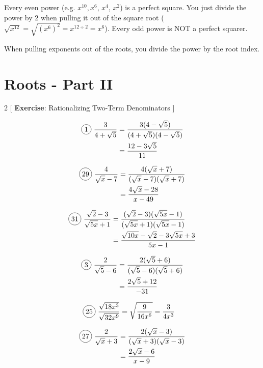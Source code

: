 Every even power (e.g. $x^{10}, $$x^{6}$, $x^{4}$, $x^{2}$) is a perfect square. You just divide the power by 2 when pulling it out of the square root ($\sqrt{x^{12}}=\sqrt{(x^{6})^{2}}=x^{12\div 2}=x^{6}$). Every odd power is NOT a perfect squarer.

When pulling exponents out of the roots, you divide the power by the root index.

\section{Roots - Part II}

\begin{multicols}{2}
[
  \textbf{Exercise}: Rationalizing Two-Term Denominators
]

\begin{align*}
  \circled{1}\ \frac{3}{4+\sqrt{5}}&=\frac{3(4-\sqrt{5})}{(4+\sqrt{5})(4-\sqrt{5})}\\
  &=\frac{12-3\sqrt{5}}{11}
\end{align*}

\begin{align*}
  \circled{29}\ \frac{4}{\sqrt{x}-7}&=\frac{4(\sqrt{x}+7)}{(\sqrt{x}-7)(\sqrt{x}+7)}\\
  &=\frac{4\sqrt{x}-28}{x-49}
\end{align*}

\begin{align*}
  \circled{31}\ \frac{\sqrt{2}-3}{\sqrt{5x}+1}&=\frac{(\sqrt{2}-3)(\sqrt{5x}-1)}{(\sqrt{5x}+1)(\sqrt{5x}-1)}\\
  &=\frac{\sqrt{10x}-\sqrt{2}-3\sqrt{5x}+3}{5x-1}
\end{align*}

\begin{align*}
  \circled{3}\ \frac{2}{\sqrt{5}-6}&=\frac{2(\sqrt{5}+6)}{(\sqrt{5}-6)(\sqrt{5}+6)}\\
  &=\frac{2\sqrt{5}+12}{-31}
\end{align*}

\begin{align*}
  \circled{25}\ \frac{\sqrt{18x^{3}}}{\sqrt{32x^{9}}}&=\sqrt{\frac{9}{16x^{6}}}=\frac{3}{4x^{3}}
\end{align*}

\begin{align*}
  \circled{27}\ \frac{2}{\sqrt{x}+3}&=\frac{2(\sqrt{x}-3)}{(\sqrt{x}+3)(\sqrt{x}-3)}\\
  &=\frac{2\sqrt{x}-6}{x-9}
\end{align*}

\end{multicols}

